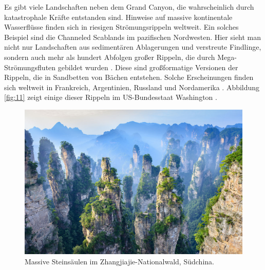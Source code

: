 \documentclass[10pt,twocolumn,letterpaper]{article}
\begin{document}
Es gibt viele Landschaften neben dem Grand Canyon, die wahrscheinlich durch katastrophale Kräfte entstanden sind. Hinweise auf massive kontinentale Wasserflüsse finden sich in riesigen Strömungsrippeln weltweit. Ein solches Beispiel sind die Channeled Scablands im pazifischen Nordwesten. Hier sieht man nicht nur Landschaften aus sedimentären Ablagerungen und verstreute Findlinge, sondern auch mehr als hundert Abfolgen großer Rippeln, die durch Mega-Strömungsfluten gebildet wurden \cite{78,79}. Diese sind großformatige Versionen der Rippeln, die in Sandbetten von Bächen entstehen. Solche Erscheinungen finden sich weltweit in Frankreich, Argentinien, Russland und Nordamerika \cite{81}. Abbildung \ref{fig:11} zeigt einige dieser Rippeln im US-Bundesstaat Washington \cite{80}.
\begin{figure}[b]
\begin{center}
   \includegraphics[width=1\linewidth]{zhangjiajie.jpg}
\end{center}
   \caption{Massive Steinsäulen im Zhangjiajie-Nationalwald, Südchina.}
\label{fig:12}
\label{fig:onecol}
\end{figure}
\end{document}
